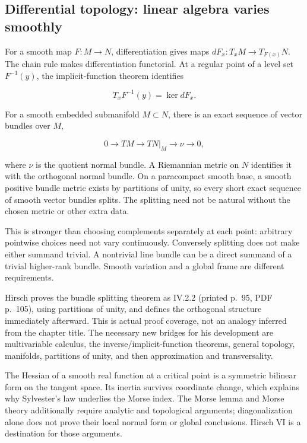 \documentclass[
  11pt,
]{article}
\begin{document}
\subsection{Differential topology: linear algebra varies
smoothly}\label{differential-topology-linear-algebra-varies-smoothly}

For a smooth map \(F:M\to N\), differentiation gives maps
\(dF_x:T_xM\to T_{F(x)}N\). The chain rule makes differentiation
functorial. At a regular point of a level set \(F^{-1}(y)\), the
implicit-function theorem identifies

\[T_xF^{-1}(y)=\ker dF_x.\]

For a smooth embedded submanifold \(M\subset N\), there is an exact
sequence of vector bundles over \(M\),

\[0\to TM\to TN|_M\to\nu\to0,\]

where \(\nu\) is the quotient normal bundle. A Riemannian metric on
\(N\) identifies it with the orthogonal normal bundle. On a paracompact
smooth base, a smooth positive bundle metric exists by partitions of
unity, so every short exact sequence of smooth vector bundles splits.
The splitting need not be natural without the chosen metric or other
extra data.

This is stronger than choosing complements separately at each point:
arbitrary pointwise choices need not vary continuously. Conversely
splitting does not make either summand trivial. A nontrivial line bundle
can be a direct summand of a trivial higher-rank bundle. Smooth
variation and a global frame are different requirements.

Hirsch proves the bundle splitting theorem as IV.2.2 (printed p.~95, PDF
p.~105), using partitions of unity, and defines the orthogonal structure
immediately afterward. This is actual proof coverage, not an analogy
inferred from the chapter title. The necessary new bridges for his
development are multivariable calculus, the inverse/implicit-function
theorems, general topology, manifolds, partitions of unity, and then
approximation and transversality.

The Hessian of a smooth real function at a critical point is a symmetric
bilinear form on the tangent space. Its inertia survives coordinate
change, which explains why Sylvester's law underlies the Morse index.
The Morse lemma and Morse theory additionally require analytic and
topological arguments; diagonalization alone does not prove their local
normal form or global conclusions. Hirsch VI is a destination for those
arguments.
\end{document}
